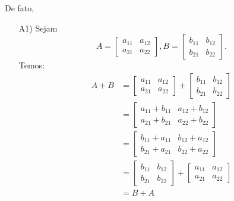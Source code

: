 \documentclass[12pt]{exam}
\begin{document}
    De fato,
    \begin{itemize}
        \item[A1)] Sejam
        \[
        A = \begin{bmatrix} a_{11} & a_{12}\\a_{21} & a_{22}\end{bmatrix},
        B = \begin{bmatrix} b_{11} & b_{12}\\b_{21} & b_{22}\end{bmatrix}.
        \]
        Temos:
        \begin{align*}
            A + B & = \begin{bmatrix} a_{11} & a_{12}\\a_{21} & a_{22}\end{bmatrix} + \begin{bmatrix} b_{11} & b_{12}\\b_{21} & b_{22}\end{bmatrix}
            \\ &= \begin{bmatrix} a_{11} + b_{11} & a_{12} + b_{12}\\a_{21} + b_{21} & a_{22} + b_{22}\end{bmatrix}
            \\ &= \begin{bmatrix} b_{11} + a_{11} & b_{12} + a_{12}\\b_{21} + a_{21} & b_{22} + a_{22}\end{bmatrix}
            \\ &= \begin{bmatrix} b_{11} & b_{12}\\b_{21} & b_{22}\end{bmatrix} + \begin{bmatrix} a_{11} & a_{12}\\a_{21} & a_{22}\end{bmatrix}
            \\ &= B + A
        \end{align*}


\end{itemize}
\end{document}
